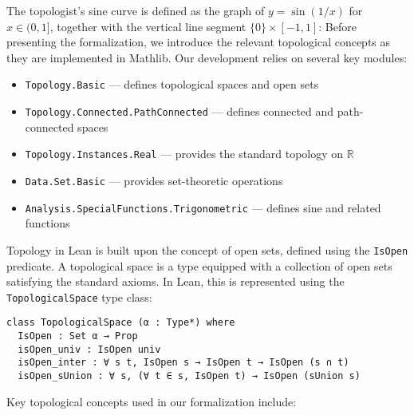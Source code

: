 The topologist's sine curve is defined as the graph of $y = \sin(1/x)$ for $x \in (0, 1]$,
together with the vertical line segment $\{0\} \times [-1, 1]$:
Before presenting the formalization, we introduce the relevant topological concepts as they
are implemented in Mathlib. Our development relies on several key modules:
\begin{itemize}
  \item \lstinline[language=lean]|Topology.Basic|
        --- defines topological spaces and open sets
  \item \lstinline[language=lean]|Topology.Connected.PathConnected|
        --- defines connected and path-connected spaces
  \item \lstinline[language=lean]|Topology.Instances.Real|
        --- provides the standard topology on $\mathbb{R}$
  \item \lstinline[language=lean]|Data.Set.Basic|
        --- provides set-theoretic operations
  \item \lstinline[language=lean]|Analysis.SpecialFunctions.Trigonometric|
        --- defines sine and related functions
\end{itemize}

Topology in Lean is built upon the concept of open sets, defined
using the \lstinline[language=lean]|IsOpen| predicate. A topological space is a type
equipped with a collection of open sets satisfying the standard axioms.
In Lean, this is represented using the \lstinline[language=lean]|TopologicalSpace| type class:
\newpage
\begin{lstlisting}[language=lean]
class TopologicalSpace (α : Type*) where
  IsOpen : Set α → Prop
  isOpen_univ : IsOpen univ
  isOpen_inter : ∀ s t, IsOpen s → IsOpen t → IsOpen (s ∩ t)
  isOpen_sUnion : ∀ s, (∀ t ∈ s, IsOpen t) → IsOpen (sUnion s)
\end{lstlisting}

Key topological concepts used in our formalization include:


